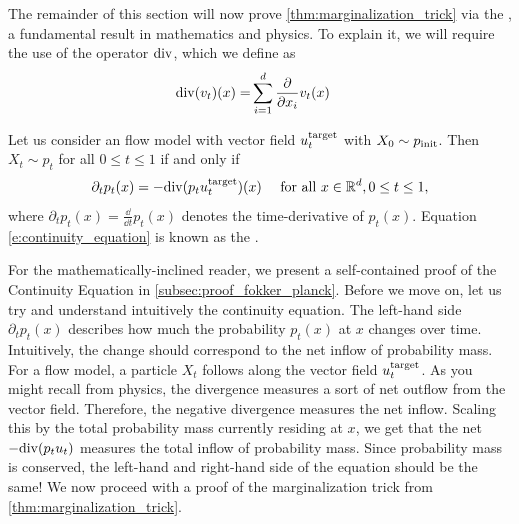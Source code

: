 The remainder of this section will now prove \cref{thm:marginalization_trick} via the , a fundamental result in mathematics and physics. To explain it, we will require the use of the  operator $\mathrm{div}$, which we define as
\begin{align}
\label{eq:divergence_laplacian_definition}
    \mathrm{div}(v_t)(x)=&\sum\limits_{i=1}^{d}\frac{\partial}{\partial x_i}v_t(x)
\end{align}
\begin{theorem}
\label{thm:continuity_equation}
Let us consider an flow model with vector field $u^{\text{target}}_t$ with $X_0\sim p_{\rm{init}}$. Then $X_t\sim p_t$ for all $0\leq t\leq 1$ if and only if
\begin{align}
\label{e:continuity_equation}
\partial_t p_t(x)=-\mathrm{div} (p_tu^{\text{target}}_t)(x)\quad \text{ for all }x\in\mathbb{R}^d, 0\leq t\leq 1,
\end{align}
where $\partial_tp_t(x)= \frac{\dd}{\dd t}p_t(x)$ denotes the time-derivative of $p_t(x)$. Equation \ref{e:continuity_equation} is known as the .
\end{theorem}
For the mathematically-inclined reader, we present a self-contained proof of the Continuity Equation in \cref{subsec:proof_fokker_planck}. Before we move on, let us try and understand intuitively the continuity equation. The left-hand side $\partial_tp_t(x)$ describes how much the probability $p_t(x)$ at $x$ changes over time. Intuitively, the change should correspond to the net inflow of probability mass. For a flow model, a particle $X_t$ follows along the vector field $u^{\text{target}}_t$. As you might recall from physics, the divergence measures a sort of net outflow from the vector field. Therefore, the negative divergence measures the net inflow. Scaling this by the total probability mass currently residing at $x$, we get that the net $-\mathrm{div} (p_tu_t)$ measures the total inflow of probability mass. Since probability mass is conserved, the left-hand and right-hand side of the equation should be the same! We now proceed with a proof of the marginalization trick from \cref{thm:marginalization_trick}.
